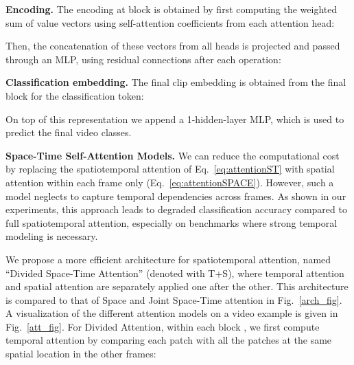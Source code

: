 \documentclass{article}
\begin{document}
\vspace{-0.3cm}

\vspace{-0.3cm}

\textbf{Encoding.} The encoding  at block  is obtained by first computing the weighted sum of value vectors using self-attention coefficients from each attention head:

\vspace{-0.3cm}


Then, the concatenation of these vectors from all heads is projected and passed through an MLP, using residual connections after each operation:

\vspace{-0.3cm}


\textbf{Classification embedding.} The final clip embedding is obtained from the final block for the classification token:

\vspace{-0.1cm}

\vspace{-0.2cm}

On top of this representation we append a 1-hidden-layer MLP, which is used to predict the final video classes. 


\textbf{Space-Time Self-Attention Models.} We can reduce the computational cost by replacing the spatiotemporal attention of Eq.~\ref{eq:attentionST} with spatial attention within each frame only (Eq.~\ref{eq:attentionSPACE}). However, such a model neglects to capture temporal dependencies across frames. As shown in our experiments, this approach leads to degraded classification accuracy compared to full spatiotemporal attention, especially on benchmarks where strong temporal modeling is necessary. 

We propose a more efficient architecture for spatiotemporal attention, named ``Divided Space-Time Attention'' (denoted with T+S), where temporal attention and spatial attention are separately applied one after the other. This architecture is compared to that of Space and Joint Space-Time attention in Fig.~\ref{arch_fig}. A visualization of the different attention models on a video example is given in Fig.~\ref{att_fig}. For Divided Attention, within each block , we first compute temporal attention by comparing each patch  with all the patches at the same spatial location in the other frames:

\vspace{-0.3cm}

\vspace{-0.3cm}
\end{document}

